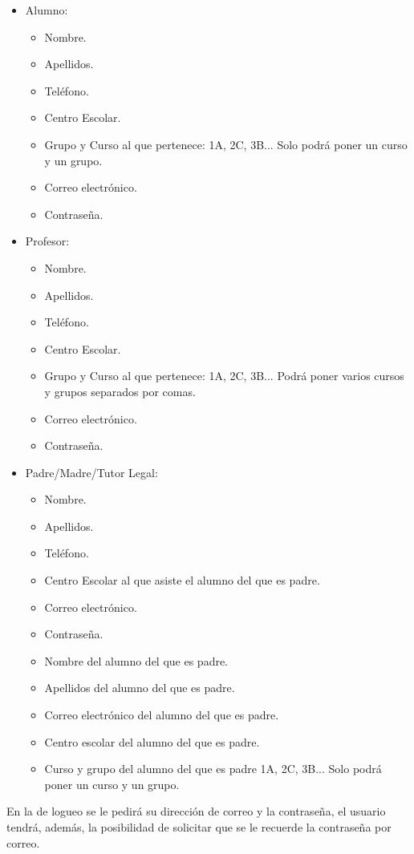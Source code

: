 \begin{itemize}
	\item Alumno:
	\begin{itemize}
		\item Nombre.
		\item Apellidos.
		\item Tel\'efono.
		\item Centro Escolar.
		\item Grupo y Curso al que pertenece: 1A, 2C, 3B... Solo podr\'a poner un curso y un grupo.
		\item Correo electr\'onico.
		\item Contrase\~na.
	\end{itemize}
	\item Profesor:
	\begin{itemize}
		\item Nombre.
		\item Apellidos.
		\item Tel\'efono.
		\item Centro Escolar.
		\item Grupo y Curso al que pertenece: 1A, 2C, 3B... Podr\'a poner varios cursos y grupos separados por comas.
		\item Correo electr\'onico.
		\item Contrase\~na.
	\end{itemize}
	\item Padre/Madre/Tutor Legal:
	\begin{itemize}
		\item Nombre.
		\item Apellidos.
		\item Tel\'efono.
		\item Centro Escolar al que asiste el alumno del que es padre.
		\item Correo electr\'onico.
		\item Contrase\~na.
		\item Nombre del alumno del que es padre.
		\item Apellidos del alumno del que es padre.
		\item Correo electr\'onico del alumno del que es padre.
		\item Centro escolar del alumno del que es padre.
		\item Curso y grupo del alumno del que es padre 1A, 2C, 3B... Solo podr\'a poner un curso y un grupo.
	\end{itemize}
\end{itemize}
En la de logueo se le pedir\'a su direcci\'on de correo y la contrase\~na, el usuario tendr\'a, adem\'as, la posibilidad de solicitar que se le recuerde la contrase\~na por correo.\\
